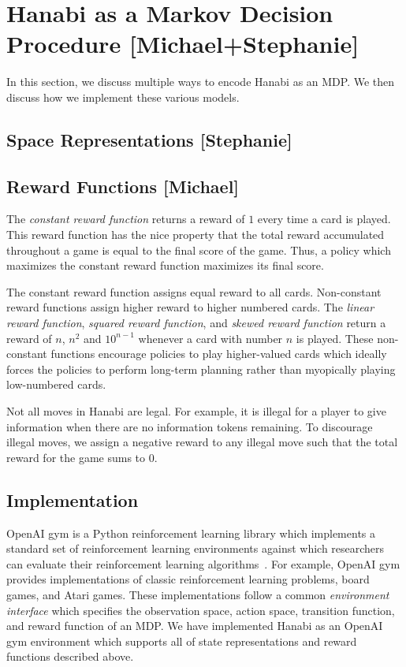 \section{Hanabi as a Markov Decision Procedure [Michael+Stephanie]}\label{sec:hanabimdp}

In this section, we discuss multiple ways to encode Hanabi as an MDP. We then
discuss how we implement these various models.

\subsection{Space Representations [Stephanie]}

\subsection{Reward Functions [Michael]}
The \emph{constant reward function} returns a reward of $1$ every time a card
is played. This reward function has the nice property that the total reward
accumulated throughout a game is equal to the final score of the game. Thus, a
policy which maximizes the constant reward function maximizes its final score.

The constant reward function assigns equal reward to all cards. Non-constant
reward functions assign higher reward to higher numbered cards. The
\emph{linear reward function}, \emph{squared reward function}, and \emph{skewed
reward function} return a reward of $n$, $n^2$ and $10^{n-1}$ whenever a card
with number $n$ is played. These non-constant functions encourage policies to
play higher-valued cards which ideally forces the policies to perform long-term
planning rather than myopically playing low-numbered cards.

Not all moves in Hanabi are legal. For example, it is illegal for a player to
give information when there are no information tokens remaining. To discourage
illegal moves, we assign a negative reward to any illegal move such that the
total reward for the game sums to 0.


\subsection{Implementation}
OpenAI gym is a Python reinforcement learning library which implements a
standard set of reinforcement learning environments against which researchers
can evaluate their reinforcement learning algorithms~\cite{brockman2016openai}.
For example, OpenAI gym provides implementations of classic reinforcement
learning problems, board games, and Atari games. These implementations follow a
common \emph{environment interface} which specifies the observation space,
action space, transition function, and reward function of an MDP. We have
implemented Hanabi as an OpenAI gym environment which supports all of state
representations and reward functions described above.

